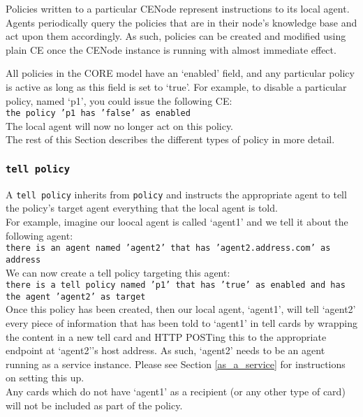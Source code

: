 \documentclass{scrartcl}
\begin{document}
Policies written to a particular CENode represent instructions to its local agent. Agents periodically query the policies that are in their node's knowledge base and act upon them accordingly. As such, policies can be created and modified using plain CE once the CENode instance is running with almost immediate effect.

All policies in the CORE model have an `enabled' field, and any particular policy is active as long as this field is set to `true'. For example, to disable a particular policy, named `p1', you could issue the following CE:\\
\texttt{the policy 'p1 has 'false' as enabled}\\
The local agent will now no longer act on this policy.\\

The rest of this Section describes the different types of policy in more detail.

\subsubsection{\texttt{tell policy}}
A \texttt{tell policy} inherits from \texttt{policy} and instructs the appropriate agent to tell the policy's target agent everything that the local agent is told.\\

For example, imagine our loocal agent is called `agent1' and we tell it about the following agent:\\
\texttt{there is an agent named 'agent2' that has 'agent2.address.com' as address}\\
We can now create a tell policy targeting this agent:\\
\texttt{there is a tell policy named 'p1' that has 'true' as enabled and has the agent 'agent2' as target}\\

Once this policy has been created, then our local agent, `agent1', will tell `agent2' every piece of information that has been told to `agent1' in tell cards by wrapping the content in a new tell card and HTTP POSTing this to the appropriate endpoint at `agent2''s host address. As such, `agent2' needs to be an agent running as a service instance. Please see Section \ref{as_a_service} for instructions on setting this up.\\

Any cards which do not have `agent1' as a recipient (or any other type of card) will not be included as part of the policy.
\end{document}
